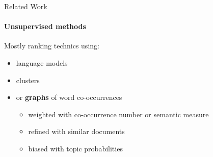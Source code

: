   \begin{frame}{Related Work}
    \framesubtitle{Unsupervised methods}

    Mostly ranking technics using:
    \begin{itemize}
      \item<2->{language models}
      \item<3->{clusters}
      \item<4->{or \textbf{graphs} of word
                co-occurrences}
      \begin{itemize}
        \item<5->{weighted with co-occurrence number or semantic measure}
        \item<6->{refined with similar documents}
        \item<7->{biased with topic probabilities}
      \end{itemize}
    \end{itemize}
    \vfill
  \end{frame}

